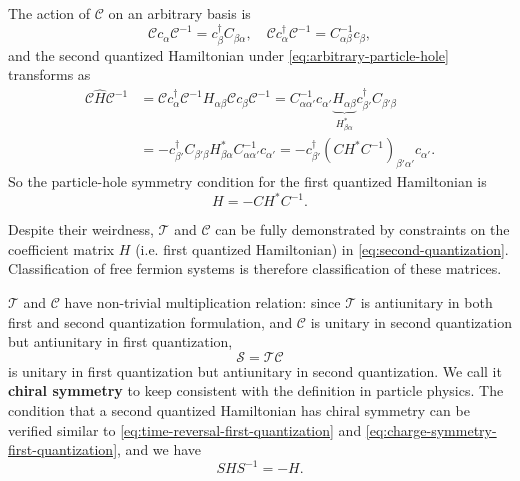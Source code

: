 \documentclass[hyperref, a4paper]{article}
\newcommand*{\concept}[1]{{\textbf{#1}}}
\begin{document}
The action of $\mathcal{C}$ on an arbitrary basis is 
\begin{equation}
    \mathcal{C} c_{\alpha} \mathcal{C}^{-1} = c_\beta^\dagger C_{\beta \alpha}, \quad 
    \mathcal{C} c^\dagger_{\alpha} \mathcal{C}^{-1} = C^{-1}_{\alpha \beta} c_\beta,
    \label{eq:arbitrary-particle-hole}
\end{equation}
and the second quantized Hamiltonian under \eqref{eq:arbitrary-particle-hole} transforms as 
\begin{equation}
    \begin{aligned}
        \mathcal{C} \hat{H} \mathcal{C}^{-1} &= \mathcal{C} c_\alpha^\dagger \mathcal{C}^{-1} H_{\alpha \beta} \mathcal{C} c_\beta \mathcal{C}^{-1} = C^{-1}_{\alpha \alpha'} c_{\alpha'} \underbrace{H_{\alpha \beta}}_{H_{\beta \alpha}^*} c^\dagger_{\beta'} C_{\beta' \beta} \\
        &= - c^\dagger_{\beta'} C_{\beta' \beta} H^*_{\beta \alpha} C^{-1}_{\alpha \alpha'} c_{\alpha'} = - c^\dagger_{\beta'} (CH^* C^{-1})_{\beta' \alpha'} c_{\alpha'}.
    \end{aligned}
\end{equation}
So the particle-hole symmetry condition for the first quantized Hamiltonian is 
\begin{equation}
    H = - C H^* C^{-1}.
    \label{eq:charge-symmetry-first-quantization}
\end{equation}

Despite their weirdness, $\mathcal{T}$ and $\mathcal{C}$ can be fully demonstrated by constraints on 
the coefficient matrix $H$ (i.e. first quantized Hamiltonian) in \eqref{eq:second-quantization}.
Classification of free fermion systems is therefore classification of these matrices. 

$\mathcal{T}$ and $\mathcal{C}$ have non-trivial multiplication relation: since $\mathcal{T}$ is antiunitary
in both first and second quantization formulation, and $\mathcal{C}$ is unitary in second quantization but 
antiunitary in first quantization, 
\begin{equation}
    \mathcal{S} = \mathcal{T} \mathcal{C}
\end{equation} 
is unitary in first quantization but antiunitary in second quantization. We call it \concept{chiral symmetry}
to keep consistent with the definition in particle physics.
The condition that a second quantized Hamiltonian has chiral symmetry can be verified similar to \eqref{eq:time-reversal-first-quantization} and \eqref{eq:charge-symmetry-first-quantization}, and we have 
\begin{equation}
    S H S^{-1} =  - H.
    \label{eq:chiral-first-quantization}
\end{equation}
\end{document}

